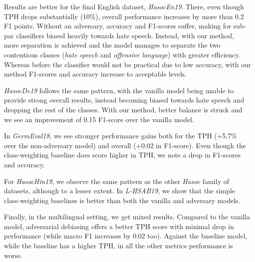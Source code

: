\documentclass[11pt]{article}
\begin{document}
	Results are better for the final English dataset, \textit{HasocEn19}. There, even though TPH drops substantially (10\%), overall performance increases by more than 0.2 F1 points. Without an adversary, accuracy and F1-scores suffer, making for sub-par classifiers biased heavily towards hate speech. Instead, with our method, more separation is achieved and the model manages to separate the two contentious classes (\textit{hate speech} and \textit{offensive language}) with greater efficiency. Whereas before the classifier would not be practical due to low accuracy, with our method F1-scores and accuracy increase to acceptable levels.
	
	\textit{HasocDe19} follows the same pattern, with the vanilla model being unable to provide strong overall results, instead becoming biased towards hate speech and dropping the rest of the classes. With our method, better balance is struck and we see an improvement of 0.15 F1-score over the vanilla model.
	
	In \textit{GermEval18}, we see stronger performance gains both for the TPH (+5.7\% over the non-adversary model) and overall (+0.02 in F1-score). Even though the class-weighting baseline does score higher in TPH, we note a drop in F1-scores and accuracy.
	
	For \textit{HasocHin19}, we observe the same pattern as the other \textit{Hasoc} family of datasets, although to a lesser extent. In \textit{L-HSAB19}, we show that the simple class-weighting baselines is better than both the vanilla and adversary models.
	
	Finally, in the multilingual setting, we get mixed results. Compared to the vanilla model, adversarial debiasing offers a better TPH score with minimal drop in performance (while macro F1 increases by 0.02 too). Against the baseline model, while the baseline has a higher TPH, in all the other metrics performance is worse.
	
\end{document}
